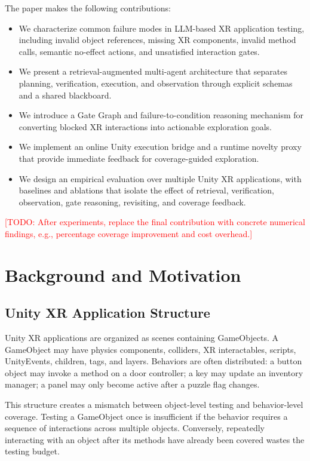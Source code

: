 \documentclass[10pt,conference]{IEEEtran}
\newcommand{\todo}[1]{\textcolor{red}{[TODO: #1]}}
\begin{document}
The paper makes the following contributions:

\begin{itemize}[leftmargin=*]
  \item We characterize common failure modes in LLM-based XR application testing,
  including invalid object references, missing XR components, invalid method
  calls, semantic no-effect actions, and unsatisfied interaction gates.
  \item We present a retrieval-augmented multi-agent architecture that separates
  planning, verification, execution, and observation through explicit schemas and
  a shared blackboard.
  \item We introduce a Gate Graph and failure-to-condition reasoning mechanism
  for converting blocked XR interactions into actionable exploration goals.
  \item We implement an online Unity execution bridge and a runtime novelty proxy
  that provide immediate feedback for coverage-guided exploration.
  \item We design an empirical evaluation over multiple Unity XR applications,
  with baselines and ablations that isolate the effect of retrieval, verification,
  observation, gate reasoning, revisiting, and coverage feedback.
\end{itemize}

\todo{After experiments, replace the final contribution with concrete numerical
findings, e.g., percentage coverage improvement and cost overhead.}

\section{Background and Motivation}

\subsection{Unity XR Application Structure}

Unity XR applications are organized as scenes containing GameObjects. A
GameObject may have physics components, colliders, XR interactables, scripts,
UnityEvents, children, tags, and layers. Behaviors are often distributed: a
button object may invoke a method on a door controller; a key may update an
inventory manager; a panel may only become active after a puzzle flag changes.

This structure creates a mismatch between object-level testing and behavior-level
coverage. Testing a GameObject once is insufficient if the behavior requires a
sequence of interactions across multiple objects. Conversely, repeatedly
interacting with an object after its methods have already been covered wastes the
testing budget.
\end{document}
